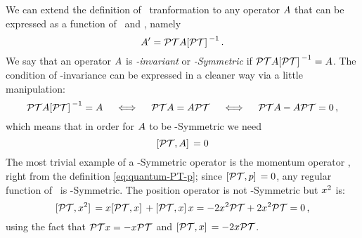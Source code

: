         We can extend the definition of \PT\ tranformation to any operator ${A}$ that can be expressed as a function of \hx\ and \hp, namely
        \begin{equation}
            \label{eq:pt-transform}
            \togglehat{A}' = \PTtransform{\togglehat{A}}
            \myperiod
        \end{equation}
        We say that an operator ${A}$ is \emph{\PT-invariant} or \emph{\PT-Symmetric} if $\PTtransform{\togglehat{A}} = \togglehat{A}$. The condition of \PT-invariance can be expressed in a cleaner way via a little manipulation:
        \begin{equation*}
            \PTtransform{\togglehat{A}} = \togglehat{A}
            \quad\iff\quad
            \hPT\togglehat{A} = \togglehat{A}\hPT
            \quad\iff\quad
            \hPT\togglehat{A} - \togglehat{A}\hPT = 0
            \mycomma
        \end{equation*}
        which means that in order for ${A}$ to be \PT-Symmetric we need
        \begin{equation}
            \label{eq:pt-symmetric-operator}
            \comm*{\hPT}{\togglehat{A}} = 0
        \end{equation}
        The most trivial example of a \PT-Symmetric operator is the momentum operator \hp, right from the definition \eqref{eq:quantum-PT-p}; since $\comm*{\hPT}{\hp} = 0$, any regular function of \hp\ is \PT-Symmetric. The position operator is not \PT-Symmetric but ${x}^2$ is:
        \begin{equation*}
            \comm*{\hPT}{x^2}
            = \hx \comm*{\hPT}{\hx} + \comm*{\hPT}{\hx} \hx
            = -2\hx^2\hPT + 2\hx^2\hPT
            = 0
            \mycomma
        \end{equation*}
        using the fact that $\mathcal{{P}}\mathcal{{T}} {x} = -{x} \mathcal{{P}}\mathcal{{T}}$ and $\comm*{\hPT}{\hx} = -2\hx\hPT$.

